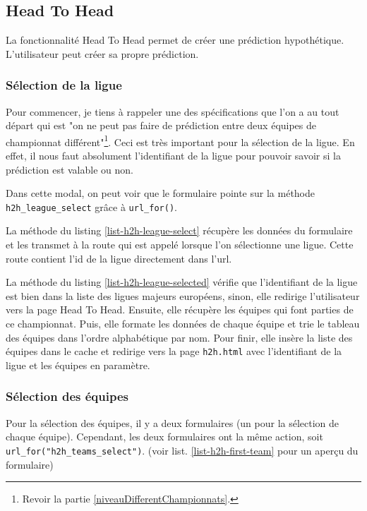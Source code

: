 \documentclass[a4paper,14pt]{extarticle}
\begin{document}
{\subsection{Head To Head}

La fonctionnalité Head To Head permet de créer une prédiction hypothétique. L'utilisateur peut créer sa propre prédiction.

\subsubsection{Sélection de la ligue}

Pour commencer, je tiens à rappeler une des spécifications que l'on a au tout départ qui est "on ne peut pas faire de prédiction entre deux équipes de championnat différent"\footnote{Revoir la partie \ref{niveauDifferentChampionnats}.}. Ceci est très important pour la sélection de la ligue. En effet, il nous faut absolument l'identifiant de la ligue pour pouvoir savoir si la prédiction est valable ou non.


Dans cette modal, on peut voir que le formulaire pointe sur la méthode \texttt{h2h\_league\_select} grâce à \texttt{url\_for()}. 

La méthode du listing \ref{list-h2h-league-select} récupère les données du formulaire et les transmet à la route qui est appelé lorsque l'on sélectionne une ligue. Cette route contient l'id de la ligue directement dans l'url. 


La méthode du listing \ref{list-h2h-league-selected} vérifie que l'identifiant de la ligue est bien dans la liste des ligues majeurs européens, sinon, elle redirige l'utilisateur vers la page Head To Head. Ensuite, elle récupère les équipes qui font parties de ce championnat. Puis, elle formate les données de chaque équipe et trie le tableau des équipes dans l'ordre alphabétique par nom. Pour finir, elle insère la liste des équipes dans le cache et redirige vers la page \texttt{h2h.html} avec l'identifiant de la ligue et les équipes en paramètre.


\subsubsection{Sélection des équipes}

Pour la sélection des équipes, il y a deux formulaires (un pour la sélection de chaque équipe). Cependant, les deux formulaires ont la même action, soit \texttt{url\_for("h2h\_teams\_select")}. (voir list. \ref{list-h2h-first-team} pour un aperçu du formulaire)

}
\end{document}
